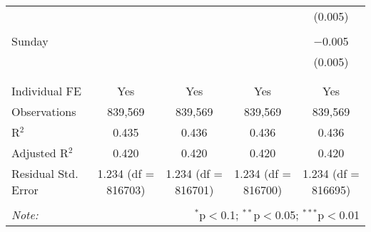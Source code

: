 \documentclass[
]{article}
\begin{document}
\begin{table}[!htbp]
{\begin{tabular}{@{\extracolsep{5pt}}lcccc}
  &  &  &  & (0.005) \\ 
  & & & & \\ 
 Sunday &  &  &  & $-$0.005 \\ 
  &  &  &  & (0.005) \\ 
  & & & & \\ 
\hline \\[-1.8ex] 
Individual FE & Yes & Yes & Yes & Yes \\ 
Observations & 839,569 & 839,569 & 839,569 & 839,569 \\ 
R$^{2}$ & 0.435 & 0.436 & 0.436 & 0.436 \\ 
Adjusted R$^{2}$ & 0.420 & 0.420 & 0.420 & 0.420 \\ 
Residual Std. Error & 1.234 (df = 816703) & 1.234 (df = 816701) & 1.234 (df = 816700) & 1.234 (df = 816695) \\ 
\hline 
\hline \\[-1.8ex] 
\textit{Note:}  & \multicolumn{4}{r}{$^{*}$p$<$0.1; $^{**}$p$<$0.05; $^{***}$p$<$0.01} \\ 
\end{tabular}
} 
\end{table} 
\newpage
\end{document}
